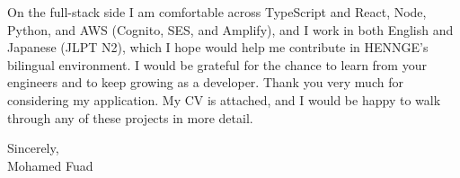 \documentclass[letterpaper,11pt]{article}
\begin{document}
On the full-stack side I am comfortable across TypeScript and React, Node, Python, and AWS (Cognito, SES, and Amplify), and I work in both English and Japanese (JLPT N2), which I hope would help me contribute in HENNGE's bilingual environment. I would be grateful for the chance to learn from your engineers and to keep growing as a developer. Thank you very much for considering my application. My CV is attached, and I would be happy to walk through any of these projects in more detail.

\vspace{10pt}

Sincerely, \\
Mohamed Fuad
\end{document}
